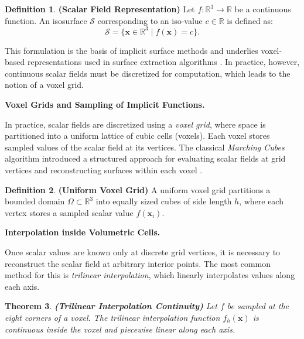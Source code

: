 \documentclass[12pt, a4paper, oneside]{book}
\theoremstyle{plain}
\newtheorem{theorem}{Theorem}[chapter]
\theoremstyle{definition}
\newtheorem{definition}[theorem]{Definition}
\theoremstyle{remark}
\theoremstyle{definition}
\begin{document}
\begin{definition}
    \textbf{(Scalar Field Representation)}
Let $f:\mathbb{R}^3 \rightarrow \mathbb{R}$ be a continuous function. An isosurface
$\mathcal{S}$ corresponding to an iso-value $c \in \mathbb{R}$ is defined as:
\[
\mathcal{S} = \{ \mathbf{x} \in \mathbb{R}^3 \mid f(\mathbf{x}) = c \}.
\]
\end{definition}

This formulation is the basis of implicit surface methods and underlies voxel-based
representations used in surface extraction algorithms
\cite{bloomenthal1997introduction,lorensen1998marching}. In practice, however, continuous
scalar fields must be discretized for computation, which leads to the notion of a voxel
grid.

\vspace{0.5em}

\textbf{Voxel Grids and Sampling of Implicit Functions.}

In practice, scalar fields are discretized using a \emph{voxel grid}, where space is
partitioned into a uniform lattice of cubic cells (voxels). Each voxel stores sampled
values of the scalar field at its vertices. The classical \emph{Marching Cubes} algorithm
introduced a structured approach for evaluating scalar fields at grid vertices and
reconstructing surfaces within each voxel \cite{lorensen1998marching}.

\begin{definition}
    \textbf{(Uniform Voxel Grid)}
A uniform voxel grid partitions a bounded domain $\Omega \subset \mathbb{R}^3$ into
equally sized cubes of side length $h$, where each vertex stores a sampled scalar value
$f(\mathbf{x}_i)$.
\end{definition}

\vspace{0.5em}

\textbf{Interpolation inside Volumetric Cells.}

Once scalar values are known only at discrete grid vertices, it is necessary to
reconstruct the scalar field at arbitrary interior points. The most common method for
this is \emph{trilinear interpolation}, which linearly interpolates values along each
axis.

\begin{theorem}
    \textbf{(Trilinear Interpolation Continuity)}
Let $f$ be sampled at the eight corners of a voxel. The trilinear interpolation function
$f_h(\mathbf{x})$ is continuous inside the voxel and piecewise linear along each axis.
\end{theorem}
\end{document}
